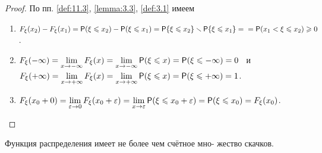 \begin{proof}
	По пп. \ref{def:11.3}, \ref{lemma:3.3}, \ref{def:3.1} имеем  
	\begin{enumerate}
		\item $F_{\xi}(x_2)-F_{\xi}(x_1)=\P(\xi\leqslant x_2)-\P(\xi\leqslant x_1)=
			\P\{\xi\leqslant x_2\}\ssm \P\{\xi\leqslant x_1\}= \\
			=\P(x_1<\xi\leqslant x_2)\geqslant 0$.
		
		\item $F_{\xi}(-\infty)=\lim\limits_{x\to-\infty}F_{\xi}(x)=\lim\limits_{x\to-\infty}\P(\xi\leqslant x)=\P(\xi\leqslant-\infty)=0$ \, и \,
		$F_{\xi}(+\infty)=\lim\limits_{x\to+\infty}F_{\xi}(x)=\lim\limits_{x\to+\infty}\P(\xi\leqslant x)=\P(\xi\leqslant+\infty)=1$.
		
		\item $F_{\xi}(x_0+0)=\lim\limits_{\varepsilon\to 0}F_{\xi}(x_0+\varepsilon)=\lim\limits_{x\to\varepsilon}\P(\xi\leqslant x_0+\varepsilon)=\P(\xi\leqslant x_0)=F_{\xi}(x_0)$.
		
	\end{enumerate}

\end{proof}

\begin{theorem}
\label{th:11.5}
	Функция распределения имеет не более чем счётное мно-
жество скачков.
\end{theorem}


